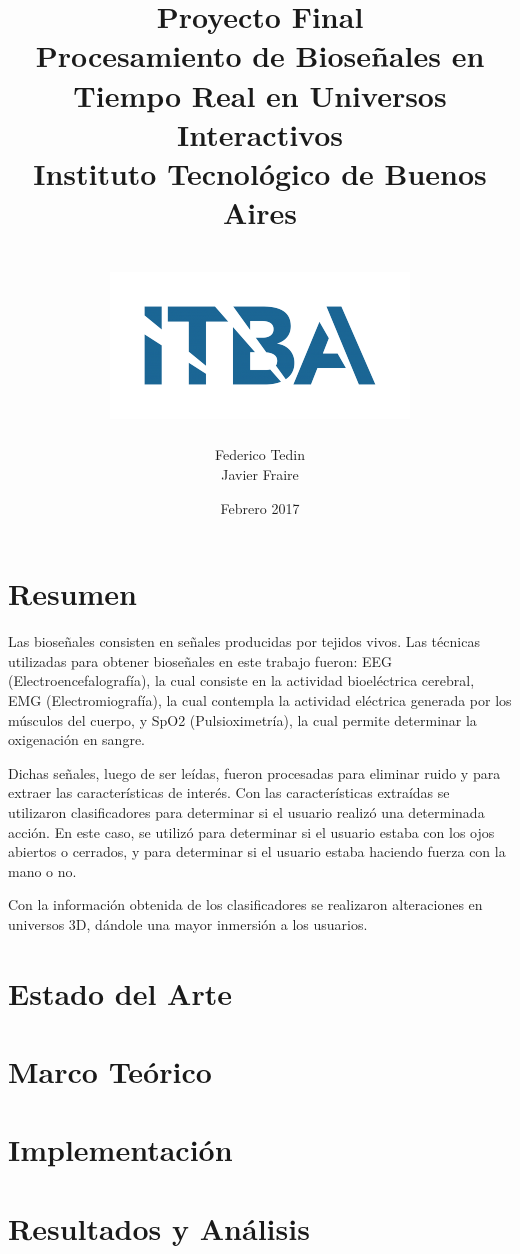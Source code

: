 \documentclass[a4paper]{report}
\title{
	{\LARGE Proyecto Final}\\
	{\Huge Procesamiento de Bioseñales en Tiempo Real en Universos Interactivos}\\
	{\large Instituto Tecnológico de Buenos Aires}\\~\\
	{\includegraphics{itba.png}}
}
\author{{Federico Tedin} \\ {Javier Fraire}}
\date{Febrero 2017}
\begin{document}
\maketitle

\chapter*{Resumen}
\justifying
Las bioseñales consisten en señales producidas por tejidos vivos. Las técnicas utilizadas para obtener bioseñales en este trabajo fueron: EEG (Electroencefalografía), la cual consiste en la actividad bioeléctrica cerebral, EMG (Electromiografía), la cual contempla la actividad eléctrica generada por los músculos del cuerpo, y SpO2 (Pulsioximetría), la cual permite determinar la oxigenación en sangre.

Dichas señales, luego de ser leídas, fueron procesadas para eliminar ruido y para extraer las características de interés. Con las características extraídas se utilizaron clasificadores para determinar si el usuario realizó una determinada acción. En este caso, se utilizó para determinar si el usuario estaba con los ojos abiertos o cerrados, y para determinar si el usuario estaba haciendo fuerza con la mano o no.

Con la información obtenida de los clasificadores se realizaron alteraciones en universos 3D, dándole una mayor inmersión a los usuarios.

\tableofcontents

\chapter{Estado del Arte}


\chapter{Marco Teórico}


\chapter{Implementación}


\chapter{Resultados y Análisis}


{}

 
\end{document}
